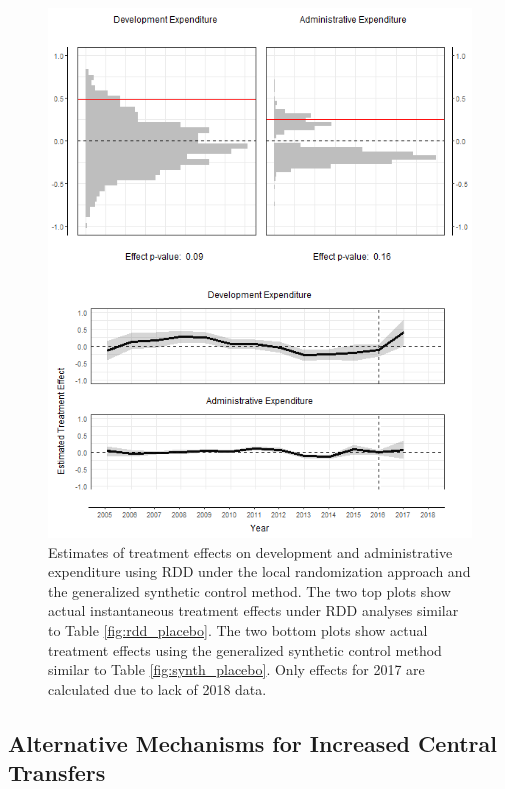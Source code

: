 \documentclass[12pt]{article}
\newcommand{\1}{\mathbbm{1}}
\begin{document}
\begin{figure}[!htbp]
	\centering
	\includegraphics[height=.75\textheight]{figure/190529_mech_results.png}
	\captionsetup{singlelinecheck=off}
	\caption[Estimated RDD and synthetic control treatment effects]{Estimates of treatment effects on development and administrative expenditure using RDD under the local randomization approach and the generalized synthetic control method. The two top plots show actual instantaneous treatment effects under RDD analyses similar to Table \ref{fig:rdd_placebo}. The two bottom plots show actual treatment effects using the generalized synthetic control method similar to Table \ref{fig:synth_placebo}. Only effects for 2017 are calculated due to lack of 2018 data.}
	\label{fig:synth_rdd_mech}
\end{figure}

\subsection{Alternative Mechanisms for Increased Central Transfers}
\end{document}

